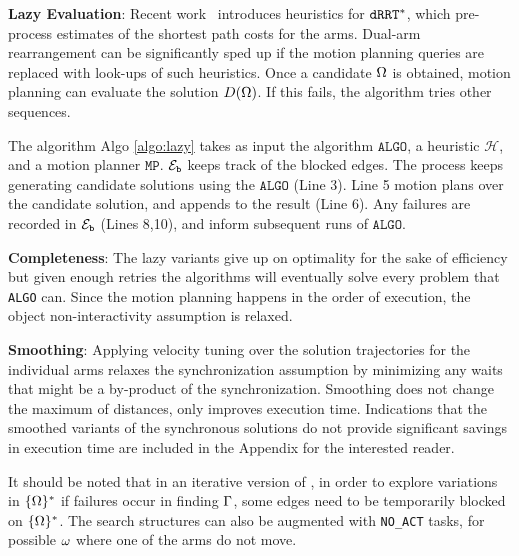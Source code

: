 
\noindent\textbf{Lazy Evaluation}: Recent work~\cite{shome2017improving} introduces heuristics for $ {\tt dRRT^*} $, which pre-process estimates of the shortest path costs for the arms. Dual-arm rearrangement can be significantly sped up if the motion planning queries are replaced with look-ups of such heuristics. Once a candidate $ {{\Omega}} $ is obtained, motion planning can evaluate the solution $ {D}({{\Omega}}) $. If this fails, the algorithm tries other sequences. 


The algorithm Algo \ref{algo:lazy} takes as input the algorithm $ \mathtt{ALGO} $, a heuristic $ \mathcal{H} $, and a motion planner $ \mathtt{MP} $. $ \mathcal{E}_{\mathtt{b}}$ keeps track of the blocked edges. The process keeps generating candidate solutions using the $ \mathtt{ALGO} $ (Line 3). Line 5 motion plans over the candidate solution, and appends to the result (Line 6). Any failures are recorded in  $ \mathcal{E}_{\mathtt{b}}$ (Lines 8,10), and inform subsequent runs of $ \mathtt{ALGO} $.


\noindent\textbf{Completeness}: 
The lazy variants give up on optimality for the sake of efficiency but given enough retries the algorithms will eventually solve every problem that {\tt ALGO} can. Since the motion planning happens in the order of execution, the object non-interactivity assumption is relaxed.

\noindent\textbf{Smoothing}: 
Applying velocity tuning over the solution trajectories for the individual arms relaxes the synchronization assumption
by minimizing any waits that might be a by-product of the synchronization. 
Smoothing does not change the maximum of distances, only improves execution time. Indications that the smoothed variants of the synchronous solutions do not provide significant savings in execution time are included in the Appendix for the interested reader.

It should be noted that in an iterative version of \algo, in order to explore variations in $ \{{{\Omega}}\}^* $ if failures occur in finding ${\Gamma}$, some edges need to be temporarily blocked on $ \{{{\Omega}}\}^* $. The search structures can also be augmented with {\tt NO\_ACT} tasks, for possible ${\omega}$ where one of the arms do not move. 

